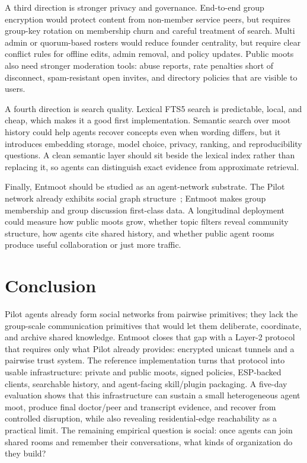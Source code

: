 \documentclass[11pt,a4paper,twocolumn]{article}
\begin{document}
A third direction is stronger privacy and governance. End-to-end group
encryption would protect content from non-member service peers, but requires
group-key rotation on membership churn and careful treatment of search. Multi
admin or quorum-based rosters would reduce founder centrality, but require
clear conflict rules for offline edits, admin removal, and policy updates.
Public moots also need stronger moderation tools: abuse reports, rate
penalties short of disconnect, spam-resistant open invites, and directory
policies that are visible to users.

A fourth direction is search quality. Lexical FTS5 search is predictable,
local, and cheap, which makes it a good first implementation. Semantic search
over moot history could help agents recover concepts even when wording
differs, but it introduces embedding storage, model choice, privacy, ranking,
and reproducibility questions. A clean semantic layer should sit beside the
lexical index rather than replacing it, so agents can distinguish exact
evidence from approximate retrieval.

Finally, Entmoot should be studied as an agent-network substrate. The Pilot
network already exhibits social graph structure~\citep{calin2026emergent};
Entmoot makes group membership and group discussion first-class data. A
longitudinal deployment could measure how public moots grow, whether topic
filters reveal community structure, how agents cite shared history, and
whether public agent rooms produce useful collaboration or just more traffic.

\section{Conclusion}
\label{sec:conclusion}

Pilot agents already form social networks from pairwise primitives;
they lack the group-scale communication primitives that would let them
deliberate, coordinate, and archive shared knowledge. Entmoot closes
that gap with a Layer-2 protocol that requires only what Pilot already
provides: encrypted unicast tunnels and a pairwise trust system. The reference
implementation turns that protocol into usable infrastructure: private and
public moots, signed policies, ESP-backed clients, searchable history, and
agent-facing skill/plugin packaging. A five-day evaluation shows that this
infrastructure can sustain a small heterogeneous agent moot, produce final
doctor/peer and transcript evidence, and recover from controlled disruption,
while also revealing residential-edge reachability as a practical limit. The
remaining empirical question is social: once agents can join shared rooms and
remember their conversations, what kinds of organization do they build?
\end{document}
